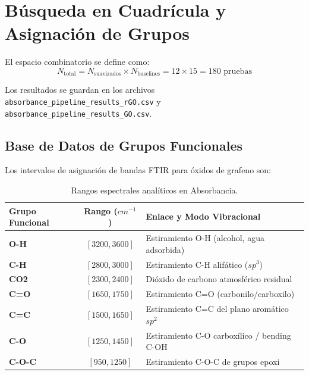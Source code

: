 \documentclass[a4paper,11pt]{article}
\begin{document}
\newpage

\section{Búsqueda en Cuadrícula y Asignación de Grupos}
El espacio combinatorio se define como:
\begin{equation}
    N_{\text{total}} = N_{\text{suavizados}} \times N_{\text{baselines}} = 12 \times 15 = 180 \text{ pruebas}
\end{equation}

Los resultados se guardan en los archivos \texttt{absorbance\_pipeline\_results\_rGO.csv} y \texttt{absorbance\_pipeline\_results\_GO.csv}.

\subsection{Base de Datos de Grupos Funcionales}
Los intervalos de asignación de bandas FTIR para óxidos de grafeno son:
\begin{table}[h]
    \centering
    \caption{Rangos espectrales analíticos en Absorbancia.}
    \begin{tabular}{lcl}
        \toprule
        Grupo Funcional & Rango ($cm^{-1}$) & Enlace y Modo Vibracional \\
        \midrule
        \textbf{O-H}   & $[3200, 3600]$ & Estiramiento O-H (alcohol, agua adsorbida) \\
        \textbf{C-H}   & $[2800, 3000]$ & Estiramiento C-H alifático ($sp^3$) \\
        \textbf{CO2}   & $[2300, 2400]$ & Dióxido de carbono atmosférico residual \\
        \textbf{C=O}   & $[1650, 1750]$ & Estiramiento C=O (carbonilo/carboxilo) \\
        \textbf{C=C}   & $[1500, 1650]$ & Estiramiento C=C del plano aromático $sp^2$ \\
        \textbf{C-O}   & $[1250, 1450]$ & Estiramiento C-O carboxílico / bending C-OH \\
        \textbf{C-O-C} & $[950, 1250]$  & Estiramiento C-O-C de grupos epoxi \\
        \bottomrule
    \end{tabular}
\end{table}
\end{document}
